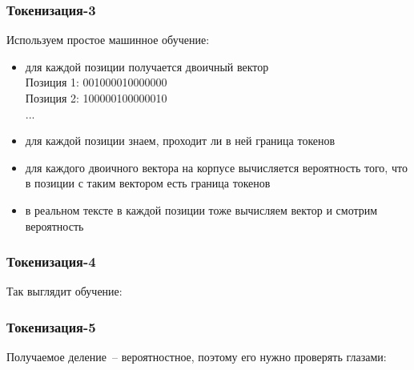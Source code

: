 \documentclass{beamer}
\begin{document}
\begin{frame}
\frametitle{Токенизация-3}
Используем простое машинное обучение:
\begin{itemize}
\item{для каждой позиции получается двоичный вектор} \\
Позиция 1: 001000010000000 \\
Позиция 2: 100000100000010 \\
...
\pause
\item{для каждой позиции знаем, проходит ли в ней граница токенов}
\pause
\item{для каждого двоичного вектора на корпусе вычисляется вероятность того, что в позиции с таким вектором есть граница токенов}
\pause
\item{в реальном тексте в каждой позиции тоже вычисляем вектор и смотрим вероятность}
\end{itemize}
\end{frame}

\begin{frame}
\frametitle{Токенизация-4}
Так выглядит обучение:
\begin{figure}
\end{figure}
\end{frame}

\begin{frame}
\frametitle{Токенизация-5}
Получаемое деление~-- вероятностное, поэтому его нужно проверять глазами:
\begin{figure}
\end{figure}
\pause
\begin{figure}
\end{figure}
\end{frame}
\end{document}
